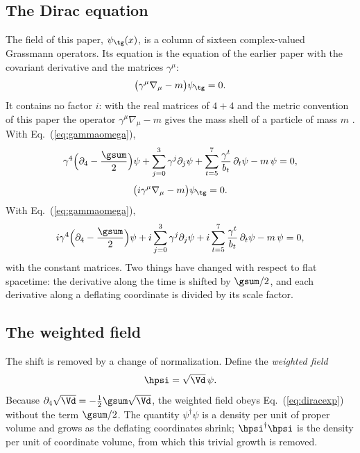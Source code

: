 \subsection{The Dirac equation}

The field of this paper, $\psi_{\tg}(x)$, is a column of sixteen complex-valued Grassmann operators.
Its equation is the equation of the earlier paper with the covariant derivative and the matrices
$\gamma^{\mu}$:
\begin{equation}
\big(\gamma^{\mu}\nabla_\mu-m\big)\psi_{\tg}=0 .
\label{eq:dirac}
\end{equation}
It contains no factor $i$: with the real matrices of $4+4$ and the metric convention of this paper
the operator $\gamma^{\mu}\nabla_\mu-m$ gives the mass shell of a particle of mass $m$
\cite{Flat1644}. With Eq.~(\ref{eq:gammaomega}),
\begin{equation}
\gamma^{4}\Big(\partial_4-\frac{\gsum}{2}\Big)\psi+\sum_{j=0}^{3}\gamma^{j}\partial_j\psi
+\sum_{t=5}^{7}\frac{\gamma^{t}}{b_t}\,\partial_t\psi-m\,\psi=0,
\label{eq:diracexp}
\end{equation}
\begin{equation}
\big(i\gamma^{\mu}\nabla_\mu-m\big)\psi_{\tg}=0 .
\label{eq:dirac}
\end{equation}
With Eq.~(\ref{eq:gammaomega}),
\begin{equation}
i\gamma^{4}\Big(\partial_4-\frac{\gsum}{2}\Big)\psi+i\sum_{j=0}^{3}\gamma^{j}\partial_j\psi
+i\sum_{t=5}^{7}\frac{\gamma^{t}}{b_t}\,\partial_t\psi-m\,\psi=0,
\label{eq:diracexp}
\end{equation}
with the constant matrices. Two things have changed with respect to flat spacetime: the derivative
along the time is shifted by $\gsum/2$, and each derivative along a deflating coordinate is divided
by its scale factor.

\subsection{The weighted field}

The shift is removed by a change of normalization. Define the \emph{weighted field}
\begin{equation}
\hpsi=\sqrt{\Vd}\,\psi .
\label{eq:weighted}
\end{equation}
Because $\partial_4\sqrt{\Vd}=-\tfrac12\gsum\sqrt{\Vd}$, the weighted field obeys
Eq.~(\ref{eq:diracexp}) without the term $\gsum/2$. The quantity $\psi^\dagger\psi$ is a density per
unit of proper volume and grows as the deflating coordinates shrink; $\hpsi^\dagger\hpsi$ is the
density per unit of coordinate volume, from which this trivial growth is removed.

